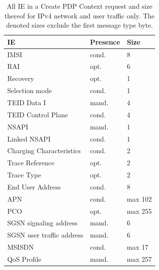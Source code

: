 \documentclass{beamer}
\begin{document}
\begin{frame}
	\begin{table}
	\tiny
	\caption{All IE in a Create PDP Context request and size thereof for IPv4 network and user traffic only. The denoted sizes exclude the first message type byte.}
		\begin{tabu} to 0.49\textwidth{X[2.5]X[1.2]X[0.7]}
			\toprule
			\textbf{IE} & \textbf{Presence} & \textbf{Size}\\
			\midrule
			IMSI & cond. & \SI{8}{\byte} \\ 
			RAI & opt. & \SI{6}{\byte} \\
			Recovery & opt. & \SI{1}{\byte} \\
			Selection mode	& cond. & \SI{1}{\byte} \\
			TEID Data I & mand. & \SI{4}{\byte} \\
			TEID Control Plane & cond. & \SI{4}{\byte} \\
			NSAPI & mand. & \SI{1}{\byte} \\
			Linked NSAPI & cond. & \SI{1}{\byte} \\
			Charging Characteristics & cond. & \SI{2}{\byte} \\
			Trace Reference & opt. & \SI{2}{\byte} \\
			Trace Type & opt. & \SI{2}{\byte} \\
			End User Address & cond. & \SI{8}{\byte} \\
			APN & cond. & max \SI{102}{\byte} \\ 
			PCO & opt. & max \SI{255}{\byte} \\ 
			SGSN signaling address & mand.  & \SI{6}{\byte} \\
			SGSN user traffic address & mand. & \SI{6}{\byte} \\ 
			MSISDN & cond. & max \SI{17}{\byte} \\ 
			QoS Profile & mand. & max \SI{257}{\byte} \\
			\bottomrule
		\end{tabu}%
\end{table}
\end{frame}
\end{document}
